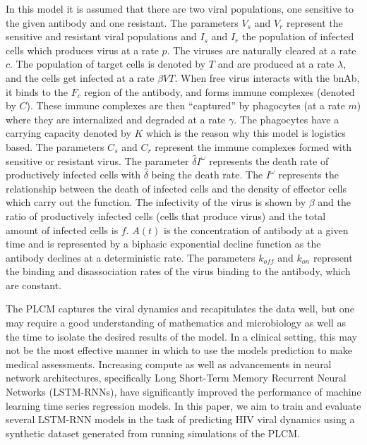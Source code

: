 \documentclass[fleqn,10pt]{wlscirep}
\begin{document}
In this model it is assumed that there are two viral populations, one sensitive to the given antibody and one resistant. The parameters $V_s$ and $V_r$ represent the sensitive and resistant viral populations and $I_s$ and $I_r$ the population of infected cells which produces virus at a rate $p$. The viruses are naturally cleared at a rate $c$. The population of target cells is denoted by $T$ and are produced at a rate $\lambda$, and the cells get infected at a rate $\beta V T$. When free virus interacts with the bnAb, it binds to the $F_c$ region of the antibody, and forms immune complexes (denoted by $C$). These immune complexes are then “captured” by phagocytes (at a rate $m$) where they are internalized and degraded at a rate $\gamma$. The phagocytes have a carrying capacity denoted by $K$ which is the reason why this model is logistics based. The parameters $C_s$ and $C_r$ represent the immune complexes formed with sensitive or resistant virus. The parameter $\hat{\delta} I^{\omega}$ represents the death rate of productively infected cells with $\hat{\delta}$ being the death rate.  The $I^{\omega}$ represents the relationship between the death of infected cells and the density of effector cells which carry out the function. The infectivity of the virus is shown by $\beta$ and the ratio of productively infected cells (cells that produce virus) and the total amount of infected cells is $f$. $A(t)$ is the concentration of antibody at a given time and is represented by a biphasic exponential decline function as the antibody declines at a deterministic rate. The parameters $k_{off}$ and $k_{on}$ represent the binding and disassociation rates of the virus binding to the antibody, which are constant.

The PLCM captures the viral dynamics and recapitulates the data well, but one may require a good understanding of mathematics and microbiology as well as the time to isolate the desired results of the model. In a clinical setting, this may not be the most effective manner in which to use the models prediction to make medical assessments. Increasing compute as well as advancements in neural network architectures, specifically Long Short-Term Memory Recurrent Neural Networks (LSTM-RNNs),\cite{Hochreiter:1997} have significantly improved the performance of machine learning time series regression models. In this paper, we aim to train and evaluate several LSTM-RNN models in the task of predicting HIV viral dynamics using a synthetic dataset generated from running simulations of the PLCM.
\end{document}
